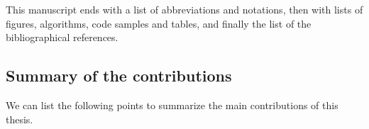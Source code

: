 %
%
This manuscript ends with
a list of abbreviations and notations, then with lists of figures, algorithms, code samples and tables,
and finally the list of the bibliographical references.





\subsection{Summary of the contributions}
\label{sec:1:summaryOfContributions}

We can list the following points to summarize the main contributions of this thesis.


